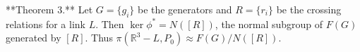 **Theorem 3.** Let $G = \{g_i\}$ be the generators and $R = \{r_i\}$ be the crossing relations for a link $L$. Then $\ker \phi^* = N([R])$, the normal subgroup of $F(G)$ generated by $[R]$. Thus $\pi(\mathbb{R}^3 - L, P_0) \approx F(G) / N([R])$.
